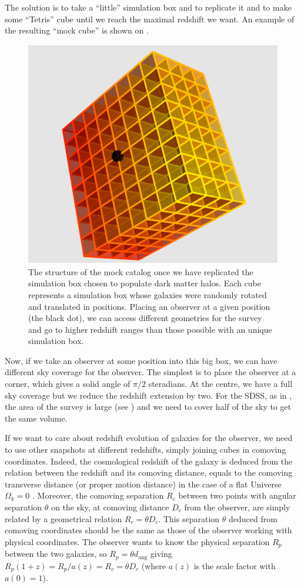The solution is to take a ``little'' simulation box and to replicate it and to
make some ``Tetris'' cube until we reach the maximal redshift we want. An
example of the resulting ``mock cube'' is shown on .
%
\begin{figure}[htb]
    \centering
    \includegraphics[width=0.4\linewidth]{figures/mock/mock}
    \caption{The structure of the mock catalog once we have replicated the
        simulation box chosen to populate dark matter halos. Each cube
        represents a simulation box whose galaxies were randomly rotated and
        translated in positions. Placing an observer at a given position (the
    black dot), we can access different geometries for the survey and go to
higher redshift ranges than those possible with an unique simulation
box.\label{fig:cubemock}}%
\end{figure}

Now, if we take an observer at some position into this big box, we can have
different sky coverage for the observer. The simplest is to place the observer
at a corner, which gives a solid angle of $\pi/2$ steradians. At the centre,
we have a full sky coverage but we reduce the redshift extension by two. For
the SDSS, as in , the area of the survey is large (see
) and we need to cover half of the sky to get the same
volume.

If we want to care about redshift evolution of galaxies for the observer, we
need to use other snapshots at different redshifts, simply joining cubes in
comoving coordinates. Indeed, the cosmological redshift of the galaxy is
deduced from the relation between the redshift and its comoving distance,
equals to the comoving transverse distance (or proper motion distance) in the
case of a flat Universe $\Omega_k=0$ \citep{Hogg+99}. Moreover, the comoving
separation $R_c$ between two points with angular separation $\theta$ on the
sky, at comoving distance $D_c$ from the observer, are simply related by a
geometrical relation $R_c=\theta D_c$. This separation $\theta$ deduced from
comoving coordinates should be the same as those of the observer working with
physical coordinates. The observer wants to know the physical separation $R_p$
between the two galaxies, so $R_p=\theta d_\mathrm{ang}$ giving $R_p
\left(1+z\right)= R_p/a\left(z\right)=R_c=\theta D_c$ (where $a \left(z\right)$
is the scale factor with $a \left(0\right)=1$).

